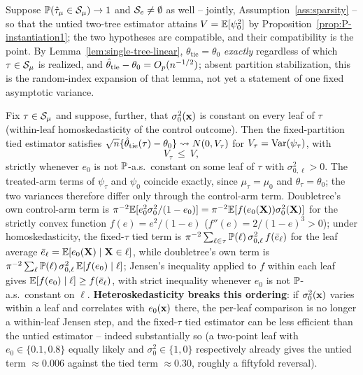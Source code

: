 \documentclass[12pt]{article}
\begin{document}
\begin{corollary}
\label{cor:single-tree-coarsening}
Suppose $\mathbb{P}(\hat{\tau}_\mu\in\mathcal{S}_\mu)\to1$ and $\mathcal{S}_e\ne\emptyset$ as well -- jointly, Assumption~\ref{ass:sparsity} -- so that the untied two-tree estimator attains $V=\mathbb{E}[\psi_0^2]$ by Proposition~\ref{prop:P-instantiation1}; the two hypotheses are compatible, and their compatibility is the point. By Lemma~\ref{lem:single-tree-linear}, $\theta_{\mathrm{tie}}=\theta_0$ \emph{exactly} regardless of which $\tau\in\mathcal{S}_\mu$ is realized, and $\hat{\theta}_{\mathrm{tie}}-\theta_0=O_p(n^{-1/2})$; absent partition stabilization, this is the random-index expansion of that lemma, not yet a statement of one fixed asymptotic variance.

Fix $\tau\in\mathcal{S}_\mu$ and suppose, further, that $\sigma_0^2(\mathbf{x})$ is constant on every leaf of $\tau$ (within-leaf homoskedasticity of the control outcome). Then the fixed-partition tied estimator satisfies $\sqrt n\{\hat{\theta}_{\mathrm{tie}}(\tau)-\theta_0\}\rightsquigarrow N(0,V_\tau)$ for $V_\tau=\operatorname{Var}(\psi_\tau)$, with
\[
  V_\tau\ \le\ V,
\]
strictly whenever $e_0$ is not $\mathbb{P}$-a.s.\ constant on some leaf of $\tau$ with $\sigma_{0,\ell}^2>0$. The treated-arm terms of $\psi_\tau$ and $\psi_0$ coincide exactly, since $\mu_\tau=\mu_0$ and $\theta_\tau=\theta_0$; the two variances therefore differ only through the control-arm term. Doubletree's own control-arm term is $\pi^{-2}\mathbb{E}[e_0^2\sigma_0^2/(1-e_0)]=\pi^{-2}\mathbb{E}[f(e_0(\mathbf{X}))\sigma_0^2(\mathbf{X})]$ for the strictly convex function $f(e)=e^2/(1-e)$ ($f''(e)=2/(1-e)^3>0$); under homoskedasticity, the fixed-$\tau$ tied term is $\pi^{-2}\sum_{\ell\in\tau}\mathbb{P}(\ell)\,\sigma_{0,\ell}^2\,f(\bar e_\ell)$ for the leaf average $\bar e_\ell=\mathbb{E}[e_0(\mathbf{X})\mid \mathbf{X}\in\ell]$, while doubletree's own term is $\pi^{-2}\sum_\ell\mathbb{P}(\ell)\,\sigma_{0,\ell}^2\,\mathbb{E}[f(e_0)\mid\ell]$; Jensen's inequality applied to $f$ within each leaf gives $\mathbb{E}[f(e_0)\mid\ell]\ge f(\bar e_\ell)$, with strict inequality whenever $e_0$ is not $\mathbb{P}$-a.s.\ constant on $\ell$. \textbf{Heteroskedasticity breaks this ordering}: if $\sigma_0^2(\mathbf{x})$ varies within a leaf and correlates with $e_0(\mathbf{x})$ there, the per-leaf comparison is no longer a within-leaf Jensen step, and the fixed-$\tau$ tied estimator can be less efficient than the untied estimator -- indeed substantially so (a two-point leaf with $e_0\in\{0.1,0.8\}$ equally likely and $\sigma_0^2\in\{1,0\}$ respectively already gives the untied term $\approx0.006$ against the tied term $\approx0.30$, roughly a fiftyfold reversal).


\end{corollary}
\end{document}
